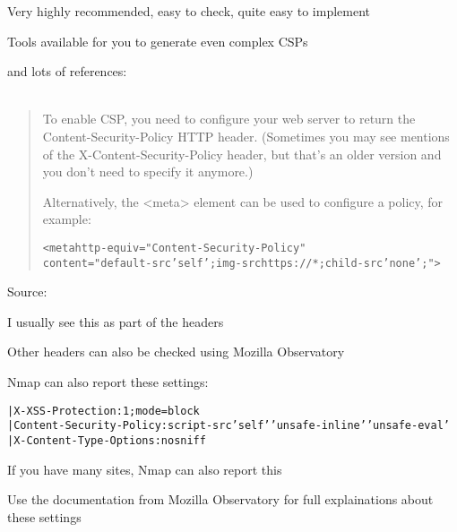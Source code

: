 \documentclass[Screen16to9,17pt]{foils}
\begin{document}
\begin{list2}
\item Very highly recommended, easy to check, quite easy to implement
\item Tools available for you to generate even complex CSPs
\item and lots of references:\\
\\
\end{list2}




\begin{quote}
To enable CSP, you need to configure your web server to return the Content-Security-Policy HTTP header. (Sometimes you may see mentions of the X-Content-Security-Policy header, but that's an older version and you don't need to specify it anymore.)

Alternatively, the <meta> element can be used to configure a policy, for example:

\begin{alltt}
<meta http-equiv="Content-Security-Policy"
      content="default-src 'self'; img-src https://*; child-src 'none';">
\end{alltt}
\end{quote}
Source: 

\begin{list2}
\item I usually see this as part of the headers
\item Other headers can also be checked using Mozilla Observatory
\end{list2}



Nmap can also report these settings:
\begin{alltt}
|     X-XSS-Protection: 1;mode=block
|     Content-Security-Policy: script-src 'self' 'unsafe-inline' 'unsafe-eval'
|     X-Content-Type-Options: nosniff
\end{alltt}

\begin{list2}
\item If you have many sites, Nmap can also report this
\item Use the documentation from Mozilla Observatory for full explainations about these settings
\end{list2}
\end{document}
